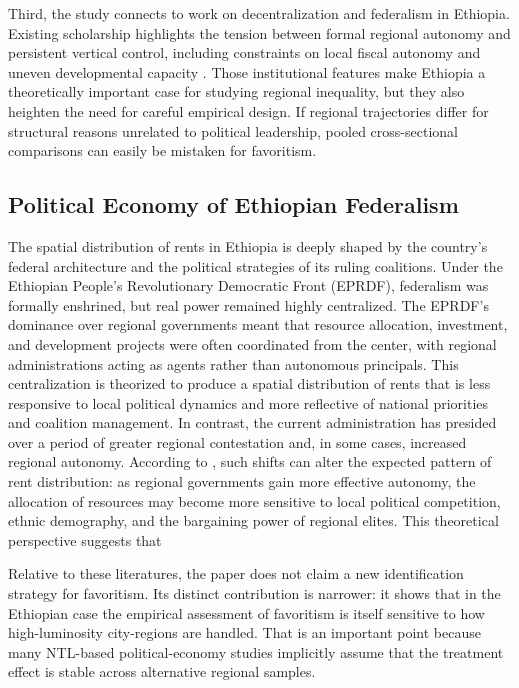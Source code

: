 \documentclass[12pt,a4paper]{article}
\begin{document}
Third, the study connects to work on decentralization and federalism in Ethiopia. Existing scholarship highlights the tension between formal regional autonomy and persistent vertical control, including constraints on local fiscal autonomy and uneven developmental capacity \citep{Faguet2021,Wubneh2017}. Those institutional features make Ethiopia a theoretically important case for studying regional inequality, but they also heighten the need for careful empirical design. If regional trajectories differ for structural reasons unrelated to political leadership, pooled cross-sectional comparisons can easily be mistaken for favoritism.

\subsection*{Political Economy of Ethiopian Federalism}
The spatial distribution of rents in Ethiopia is deeply shaped by the country’s federal architecture and the political strategies of its ruling coalitions. Under the Ethiopian People’s Revolutionary Democratic Front (EPRDF), federalism was formally enshrined, but real power remained highly centralized. The EPRDF’s dominance over regional governments meant that resource allocation, investment, and development projects were often coordinated from the center, with regional administrations acting as agents rather than autonomous principals. This centralization is theorized to produce a spatial distribution of rents that is less responsive to local political dynamics and more reflective of national priorities and coalition management. In contrast, the current administration has presided over a period of greater regional contestation and, in some cases, increased regional autonomy. According to \citet{Faguet2021}, such shifts can alter the expected pattern of rent distribution: as regional governments gain more effective autonomy, the allocation of resources may become more sensitive to local political competition, ethnic demography, and the bargaining power of regional elites. This theoretical perspective suggests that

Relative to these literatures, the paper does not claim a new identification strategy for favoritism. Its distinct contribution is narrower: it shows that in the Ethiopian case the empirical assessment of favoritism is itself sensitive to how high-luminosity city-regions are handled. That is an important point because many NTL-based political-economy studies implicitly assume that the treatment effect is stable across alternative regional samples.
\end{document}
